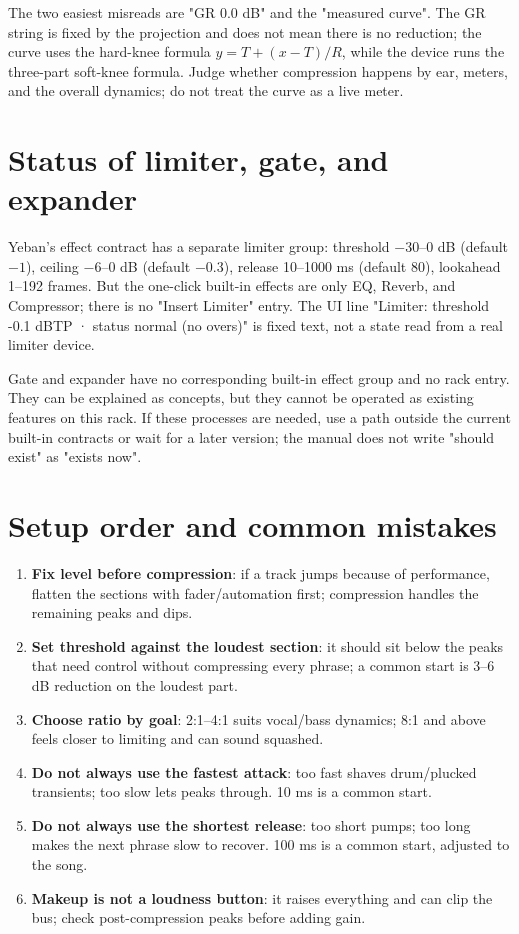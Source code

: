 The two easiest misreads are "GR 0.0 dB" and the "measured curve". The GR string is fixed by the projection and does not mean there is no reduction; the curve uses the hard-knee formula $y=T+(x-T)/R$, while the device runs the three-part soft-knee formula. Judge whether compression happens by ear, meters, and the overall dynamics; do not treat the curve as a live meter.


\section{Status of limiter, gate, and expander}

Yeban's effect contract has a separate limiter group: threshold $-30$–$0$ dB (default $-1$), ceiling $-6$–$0$ dB (default $-0.3$), release 10–1000 ms (default 80), lookahead 1–192 frames. But the one-click built-in effects are only EQ, Reverb, and Compressor; there is no "Insert Limiter" entry. The UI line "Limiter: threshold -0.1 dBTP · status normal (no overs)" is fixed text, not a state read from a real limiter device.

Gate and expander have no corresponding built-in effect group and no rack entry. They can be explained as concepts, but they cannot be operated as existing features on this rack. If these processes are needed, use a path outside the current built-in contracts or wait for a later version; the manual does not write "should exist" as "exists now".

\section{Setup order and common mistakes}

\begin{enumerate}
  \item \textbf{Fix level before compression}: if a track jumps because of performance, flatten the sections with fader/automation first; compression handles the remaining peaks and dips.
  \item \textbf{Set threshold against the loudest section}: it should sit below the peaks that need control without compressing every phrase; a common start is 3–6 dB reduction on the loudest part.
  \item \textbf{Choose ratio by goal}: 2:1–4:1 suits vocal/bass dynamics; 8:1 and above feels closer to limiting and can sound squashed.
  \item \textbf{Do not always use the fastest attack}: too fast shaves drum/plucked transients; too slow lets peaks through. 10 ms is a common start.
  \item \textbf{Do not always use the shortest release}: too short pumps; too long makes the next phrase slow to recover. 100 ms is a common start, adjusted to the song.
  \item \textbf{Makeup is not a loudness button}: it raises everything and can clip the bus; check post-compression peaks before adding gain.
\end{enumerate}

